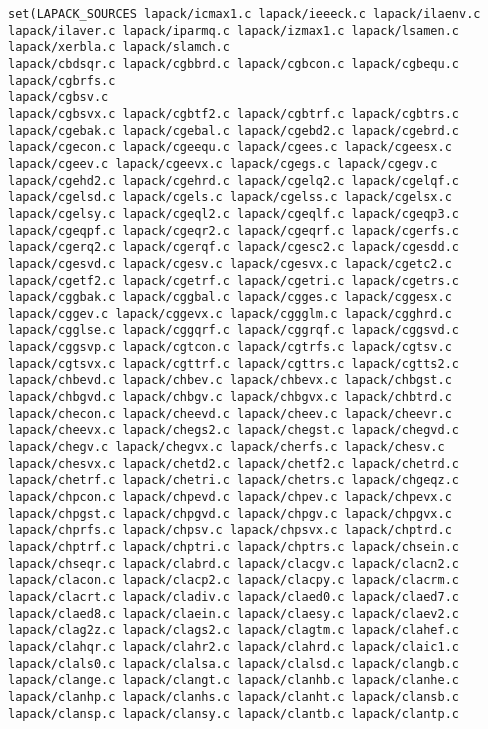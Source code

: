 \documentclass[10pt,a4paper]{article}
\begin{document}
\begin{codeparchment}
\begin{lstlisting}
set(LAPACK_SOURCES lapack/icmax1.c lapack/ieeeck.c lapack/ilaenv.c
lapack/ilaver.c lapack/iparmq.c lapack/izmax1.c lapack/lsamen.c
lapack/xerbla.c lapack/slamch.c 
lapack/cbdsqr.c lapack/cgbbrd.c lapack/cgbcon.c lapack/cgbequ.c lapack/cgbrfs.c
lapack/cgbsv.c 
lapack/cgbsvx.c lapack/cgbtf2.c lapack/cgbtrf.c lapack/cgbtrs.c
lapack/cgebak.c lapack/cgebal.c lapack/cgebd2.c lapack/cgebrd.c
lapack/cgecon.c lapack/cgeequ.c lapack/cgees.c lapack/cgeesx.c 
lapack/cgeev.c lapack/cgeevx.c lapack/cgegs.c lapack/cgegv.c 
lapack/cgehd2.c lapack/cgehrd.c lapack/cgelq2.c lapack/cgelqf.c 
lapack/cgelsd.c lapack/cgels.c lapack/cgelss.c lapack/cgelsx.c 
lapack/cgelsy.c lapack/cgeql2.c lapack/cgeqlf.c lapack/cgeqp3.c 
lapack/cgeqpf.c lapack/cgeqr2.c lapack/cgeqrf.c lapack/cgerfs.c 
lapack/cgerq2.c lapack/cgerqf.c lapack/cgesc2.c lapack/cgesdd.c 
lapack/cgesvd.c lapack/cgesv.c lapack/cgesvx.c lapack/cgetc2.c 
lapack/cgetf2.c lapack/cgetrf.c lapack/cgetri.c lapack/cgetrs.c 
lapack/cggbak.c lapack/cggbal.c lapack/cgges.c lapack/cggesx.c 
lapack/cggev.c lapack/cggevx.c lapack/cggglm.c lapack/cgghrd.c 
lapack/cgglse.c lapack/cggqrf.c lapack/cggrqf.c lapack/cggsvd.c 
lapack/cggsvp.c lapack/cgtcon.c lapack/cgtrfs.c lapack/cgtsv.c 
lapack/cgtsvx.c lapack/cgttrf.c lapack/cgttrs.c lapack/cgtts2.c 
lapack/chbevd.c lapack/chbev.c lapack/chbevx.c lapack/chbgst.c 
lapack/chbgvd.c lapack/chbgv.c lapack/chbgvx.c lapack/chbtrd.c 
lapack/checon.c lapack/cheevd.c lapack/cheev.c lapack/cheevr.c 
lapack/cheevx.c lapack/chegs2.c lapack/chegst.c lapack/chegvd.c 
lapack/chegv.c lapack/chegvx.c lapack/cherfs.c lapack/chesv.c 
lapack/chesvx.c lapack/chetd2.c lapack/chetf2.c lapack/chetrd.c 
lapack/chetrf.c lapack/chetri.c lapack/chetrs.c lapack/chgeqz.c 
lapack/chpcon.c lapack/chpevd.c lapack/chpev.c lapack/chpevx.c 
lapack/chpgst.c lapack/chpgvd.c lapack/chpgv.c lapack/chpgvx.c 
lapack/chprfs.c lapack/chpsv.c lapack/chpsvx.c lapack/chptrd.c 
lapack/chptrf.c lapack/chptri.c lapack/chptrs.c lapack/chsein.c 
lapack/chseqr.c lapack/clabrd.c lapack/clacgv.c lapack/clacn2.c 
lapack/clacon.c lapack/clacp2.c lapack/clacpy.c lapack/clacrm.c 
lapack/clacrt.c lapack/cladiv.c lapack/claed0.c lapack/claed7.c 
lapack/claed8.c lapack/claein.c lapack/claesy.c lapack/claev2.c 
lapack/clag2z.c lapack/clags2.c lapack/clagtm.c lapack/clahef.c 
lapack/clahqr.c lapack/clahr2.c lapack/clahrd.c lapack/claic1.c 
lapack/clals0.c lapack/clalsa.c lapack/clalsd.c lapack/clangb.c 
lapack/clange.c lapack/clangt.c lapack/clanhb.c lapack/clanhe.c 
lapack/clanhp.c lapack/clanhs.c lapack/clanht.c lapack/clansb.c 
lapack/clansp.c lapack/clansy.c lapack/clantb.c lapack/clantp.c 

\end{lstlisting}
\end{codeparchment}
\end{document}
